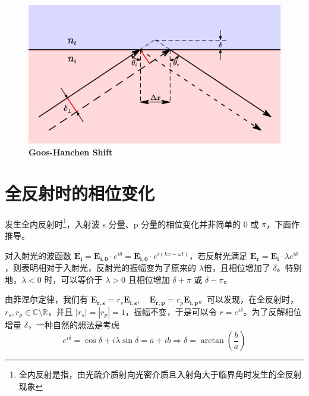 \documentclass[UTF8]{report}
\def\R{\mathbb{R}}
\def\C{\mathbb{C}}
\theoremstyle{MyLineTheoremStyle} %
\theoremstyle{MyBlockTheoremStyle} %
\theoremstyle{MySubsubsectionStyle} %
\begin{document}
\begin{figure}[H]\centering
\includegraphics[width=0.8\columnwidth]{assets/1,2/GHShift.pdf}
\caption{\bfseries Goos-Hanchen Shift}\label{Goos-Hanchen Shift}
\end{figure}

\section{全反射时的相位变化}\label{全反射时的相位变化}


发生全内反射时\footnote{全内反射是指，由光疏介质射向光密介质且入射角大于临界角时发生的全反射现象}，入射波 s 分量、p 分量的相位变化并非简单的 0 或 $\pi$，下面作推导。

对入射光的波函数 $\boldsymbol{E_i} = \boldsymbol{E_{i,0}} \cdot e^{i \theta} =\boldsymbol{E_{i,0}} \cdot e^{i(k x - \omega t)}$，若反射光满足 $\boldsymbol{E_{r}} = \boldsymbol{E_i}\cdot \lambda e^{i \delta}$，则表明相对于入射光，反射光的振幅变为了原来的 $\lambda$倍，且相位增加了 $\delta$。特别地，$\lambda < 0$ 时，可以等价于 $\lambda > 0$ 且相位增加 $\delta + \pi$ 或 $\delta - \pi$。

由菲涅尔定律，我们有 $\boldsymbol{E_{r,s}} = r_s \boldsymbol{E_{i,s}},\quad \boldsymbol{E_{r,p}} = r_p \boldsymbol{E_{i,p}}$。可以发现，在全反射时，$r_s, r_p \in \C \setminus \R$，并且 $| r_s | = | r_p | = 1$，振幅不变，于是可以令 $r = e^{i \delta }$。为了反解相位增量 $\delta $，一种自然的想法是考虑 
\begin{equation}
    e^{i \delta} = \cos \delta + i \lambda \sin \delta = a + ib \Longrightarrow  \delta =  \arctan \left( \frac{b}{a} \right)
\end{equation}
\end{document}
